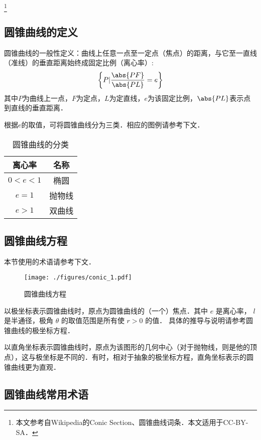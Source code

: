 
\begin{issues}
\issueDraft
\end{issues}
\footnote{本文参考自Wikipedia的Conic Section、圆锥曲线词条．本文适用于CC-BY-SA．}

\subsection{圆锥曲线的定义}
圆锥曲线的一般性定义：曲线上任意一点至一定点（焦点）的距离，与它至一直线（准线）的垂直距离始终成固定比例（离心率）:
\begin{equation}
\left \{P \vert \frac{\abs{PF}}{\abs{PL}}=e \right \}
\end{equation}
其中$P$为曲线上一点，$F$为定点，$L$为定直线，$e$为该固定比例，$\abs{PL}$表示点到直线的垂直距离．

根据$e$的取值，可将圆锥曲线分为三类．相应的图例请参考下文．
\begin{table}[ht]
\centering
\caption{圆锥曲线的分类}\label{conic_tab2}
\begin{tabular}{|c|c|}
\hline
离心率 & 名称\\
\hline
$0<e<1$ & 椭圆\\
\hline
$e=1$ & 抛物线\\
\hline
$e>1$ & 双曲线\\
\hline
\end{tabular}
\end{table}

\subsection{圆锥曲线方程}
本节使用的术语请参考下文．
\begin{figure}[ht]
\centering
\texttt{[image: ./figures/conic\_1.pdf]}
\caption{圆锥曲线方程} \label{conic_fig1}
\end{figure}

以极坐标表示圆锥曲线时，原点为圆锥曲线的（一个）焦点．其中 $e$ 是离心率， $l$ 是半通径，极角 $\theta$ 的取值范围是所有使 $r>0$ 的值． 
具体的推导与说明请参考圆锥曲线的极坐标方程．

以直角坐标表示圆锥曲线时，原点为该图形的几何中心（对于抛物线，则是他的顶点），这与极坐标是不同的．有时，相对于抽象的极坐标方程，直角坐标表示的圆锥曲线更为直观．

\subsection{圆锥曲线常用术语}

